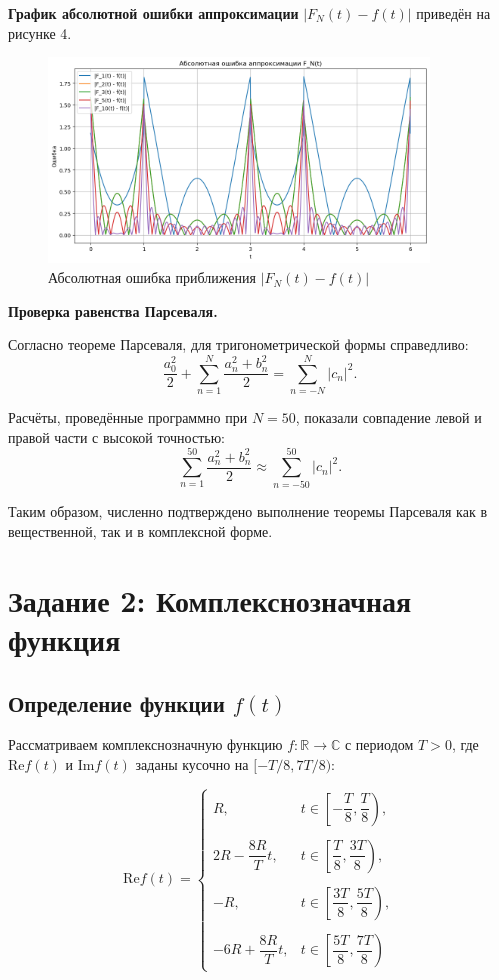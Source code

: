 \textbf{График абсолютной ошибки аппроксимации} $|F_N(t) - f(t)|$ приведён на рисунке 4.

\begin{figure}[H]
    \centering
    \includegraphics[width=0.9\textwidth]{error_plot.png}
    \caption{Абсолютная ошибка приближения $|F_N(t) - f(t)|$}
    \label{fig:error}
\end{figure}

\textbf{Проверка равенства Парсеваля.}

Согласно теореме Парсеваля, для тригонометрической формы справедливо:
\[
\frac{a_0^2}{2} + \sum_{n=1}^{N} \frac{a_n^2 + b_n^2}{2}
= \sum_{n=-N}^{N} |c_n|^2.
\]

Расчёты, проведённые программно при $N = 50$, показали совпадение левой и правой части с высокой точностью:
\[
\sum_{n=1}^{50} \frac{a_n^2 + b_n^2}{2} \approx \sum_{n=-50}^{50} |c_n|^2.
\]

Таким образом, численно подтверждено выполнение теоремы Парсеваля как в вещественной, так и в комплексной форме.


\section*{Задание 2: Комплекснозначная функция}

\subsection*{Определение функции $f(t)$}

Рассматриваем комплекснозначную функцию $f: \mathbb{R} \rightarrow \mathbb{C}$ с периодом $T > 0$, где $\text{Re} f(t)$ и $\text{Im} f(t)$ заданы кусочно на $[-T/8, 7T/8)$:

\[
\text{Re} f(t) =
\begin{cases}
R, & t \in \left[ -\dfrac{T}{8}, \dfrac{T}{8} \right), \\\\
2R - \dfrac{8R}{T} t, & t \in \left[ \dfrac{T}{8}, \dfrac{3T}{8} \right), \\\\
- R, & t \in \left[ \dfrac{3T}{8}, \dfrac{5T}{8} \right), \\\\
-6R + \dfrac{8R}{T} t, & t \in \left[ \dfrac{5T}{8}, \dfrac{7T}{8} \right)
\end{cases}
\]

